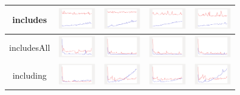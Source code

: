 \begin{longtable}{ c|c c c c}
includes
&
\includegraphics[width=1.6cm]{graphs/sequence/small/Includes}
&
\includegraphics[width=1.6cm]{graphs/set/small/Includes}
&
\includegraphics[width=1.6cm]{graphs/bag/small/Includes}
&
\includegraphics[width=1.6cm]{graphs/orderedset/small/Includes}
\\\hline

includesAll
&
\includegraphics[width=1.6cm]{graphs/sequence/small/IncludesAll}
&
\includegraphics[width=1.6cm]{graphs/set/small/IncludesAll}
&
\includegraphics[width=1.6cm]{graphs/bag/small/IncludesAll}
&
\includegraphics[width=1.6cm]{graphs/orderedset/small/IncludesAll}
\\\hline

including
&
\includegraphics[width=1.6cm]{graphs/sequence/small/Including}
&
\includegraphics[width=1.6cm]{graphs/set/small/Including}
&
\includegraphics[width=1.6cm]{graphs/bag/small/Including}
&
\includegraphics[width=1.6cm]{graphs/orderedset/small/Including}
\\\hline


\end{longtable}
